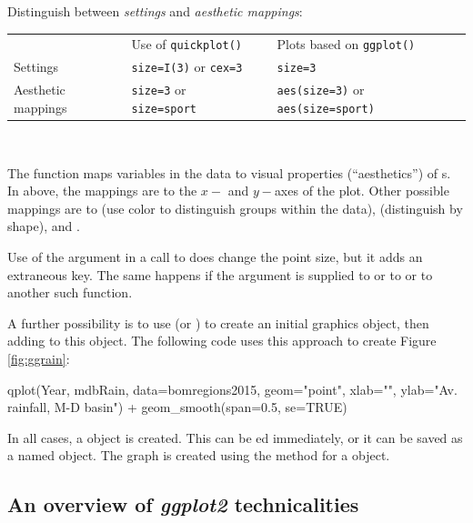Distinguish between {\em settings} and {\em aesthetic mappings}:\\[4pt]
\hspace*{6pt}
\begin{fullwidth}
\begin{tabular}{llll}
&  Use of \texttt{quickplot()} && Plots based on \texttt{ggplot()}\\
\cline{2-2} \cline{4-4}
Settings &  \texttt{size=I(3)} or \texttt{cex=3}&&
\texttt{size=3}\\
Aesthetic mappings & \texttt{size=3} or \texttt{size=sport} &&
\texttt{aes(size=3)} or \texttt{aes(size=sport)}\\
\cline{2-2} \cline{4-4}
\end{tabular}\\[8pt]
\end{fullwidth}
The function  maps variables in the data to visual
properties (``aesthetics'') of s.  In  above, the mappings are to the $x-$ and $y-$axes of the plot.
Other possible mappings are to  (use color to distinguish
groups within the data),   (distinguish by
shape),  and .

Use of the argument  in a call to 
does change the point size, but it adds an extraneous key.
The same happens if the argument 
is supplied to  or to  or
to another such function.

A further possibility is to use  (or )
to create an initial graphics object, then adding to this object. The
following code uses this approach to create Figure \ref{fig:ggrain}:
\begin{Schunk}
\begin{Sinput}
qplot(Year, mdbRain, data=bomregions2015,
      geom="point",
      xlab="", ylab="Av. rainfall, M-D basin") +
  geom_smooth(span=0.5, se=TRUE)
\end{Sinput}
\end{Schunk}

In all cases, a  object is created. This can
be ed immediately, or it can be saved as a named object.
The graph is created using the  method for a
 object.

\subsection{An overview of {\em ggplot2} technicalities}




